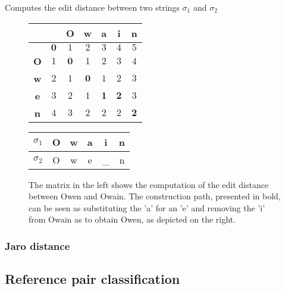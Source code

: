 \documentclass[paper=a4, fontsize=11pt]{scrartcl}
\begin{document}
\begin{algorithm}
    
    \caption{Computes the edit distance between two strings $\sigma_1$ and $\sigma_2$}
    \label{alg:edit_distance}
\end{algorithm}

\begin{figure}
    \centering
    \begin{minipage}{.65\textwidth}
        \centering
        \begin{tabular}{c|c|c|c|c|c|c|}
              &   & \textbf{O} & \textbf{w} & \textbf{a} & \textbf{i} & \textbf{n}  \\\hline
              & $\bm{0}$ & $1$ & $2$ & $3$ & $4$ & $5$ \\\hline
            \textbf{O} & $1$ & $\bm{0}$ & $1$ & $2$ & $3$ & $4$ \\\hline
            \textbf{w} & $2$ & $1$ & $\bm{0}$ & $1$ & $2$ & $3$ \\\hline
            \textbf{e} & $3$ & $2$ & $1$ & $\bm{1}$ & $\bm{2}$ & $3$ \\\hline
            \textbf{n} & $4$ & $3$ & $2$ & $2$ & $2$ & $\bm{2}$ \\\hline
        \end{tabular}
    \end{minipage}%
    \begin{minipage}{.35\textwidth}
        \centering
        \begin{tabular}{c||c|c|c|c|c}
            $\sigma_1$ & O & w & a & i & n \\\hline
            $\sigma_2$ & O & w & e & \_ & n
        \end{tabular}
    \end{minipage}
    \caption{The matrix in the left shows the computation of the edit distance between Owen and Owain. The construction path, presented in bold, can be seen as substituting the 'a' for an 'e' and removing the 'i' from Owain as to obtain Owen, as depicted on the right.}
    \label{fig:edit_distance}
\end{figure}


\subsubsection{Jaro distance}

\subsection{Reference pair classification}
\end{document}
